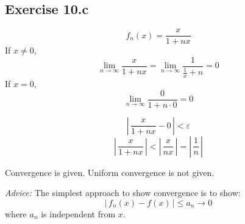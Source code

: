 \documentclass[a4paper]{article}
\theoremstyle{definition}
\newcommand\abs[1]{\left|\,#1\,\right|}
\begin{document}
\subsection{Exercise 10.c}
%
\[ f_n(x) = \frac{x}{1 + nx} \]
If $x \neq 0$,
\[ \lim_{n\to\infty} \frac{x}{1 + nx} = \lim_{n\to\infty} \frac{1}{\frac1x + n} = 0 \]
If $x = 0$,
\[ \lim_{n\to\infty} \frac{0}{1 + n \cdot 0} = 0 \]

\[ \abs{\frac{x}{1 + nx} - 0} < \varepsilon \]
\[ \abs{\frac{x}{1 + nx}} < \abs{\frac{x}{nx}} = \abs{\frac{1}{n}} \]

Convergence is given. Uniform convergence is not given.

\emph{Advice:} The simplest approach to show convergence is to show:
\[ \abs{f_n(x) - f(x)} \leq a_n \to 0 \]
where $a_n$ is independent from $x$.
\end{document}
